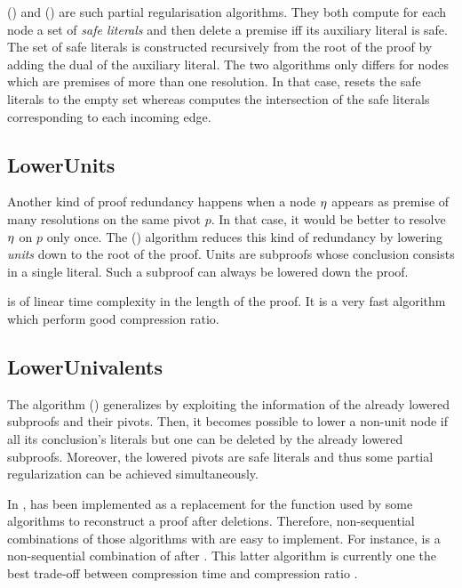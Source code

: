 \documentclass{llncs}
\begin{document}
 () \cite{RP08,RP11} and 
() \cite{LURPI} are such partial regularisation algorithms. They both compute for each
node a set of \emph{safe literals} and then delete a premise iff its auxiliary literal is safe. The
set of safe literals is constructed recursively from the root of the proof by adding the dual of the
auxiliary literal. The two algorithms only differs for nodes which are premises of more than one
resolution. In that case,  resets the safe literals to the empty set whereas 
computes the intersection of the safe literals corresponding to each incoming edge.

\subsection{LowerUnits}

Another kind of proof redundancy happens when a node $\eta$ appears as premise of many resolutions
on the same pivot $p$. In that case, it would be better to resolve $\eta$ on $p$ only once. The
 () algorithm \cite{LURPI} reduces this kind of redundancy by lowering
\emph{units} down to the root of the proof. Units are subproofs whose conclusion consists in a
single literal. Such a subproof can always be lowered down the proof.

 is of linear time complexity in the length of the proof. It is a very fast
algorithm which perform good compression ratio.

\subsection{LowerUnivalents}

The  algorithm \cite{LUniv} () generalizes  by
exploiting the information of the already lowered subproofs and their pivots. Then, it becomes
possible to lower a non-unit node if all its conclusion's literals but one can be deleted by the
already lowered subproofs. Moreover, the lowered pivots are safe literals and thus some partial
regularization can be achieved simultaneously.

In \skeptik,  has been implemented as a replacement for the  function
used by some algorithms to reconstruct a proof after deletions. Therefore, non-sequential
combinations of those algorithms with  are easy to implement. For instance,
 is a non-sequential combination of  after . This latter
algorithm is currently one the best trade-off between compression time and compression ratio
\cite{LUniv}.
\end{document}
